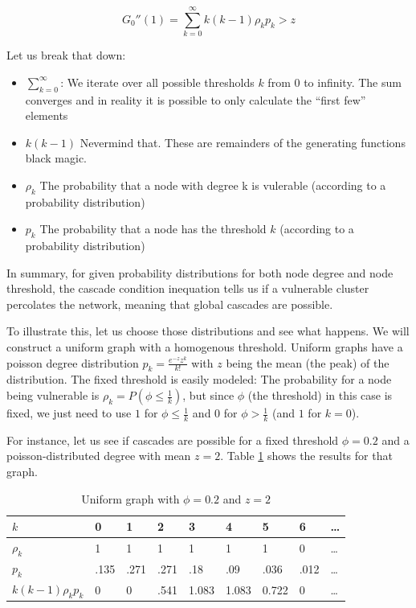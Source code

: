 \documentclass{sig-alternate-05-2015}
\begin{document}
\begin{equation}
  G_0''(1) = \sum_{k=0}^\infty k (k-1) \rho_k p_k > z
\end{equation}

Let us break that down:

\begin{itemize}
  \item $\sum_{k=0}^\infty$: We iterate over all possible thresholds $k$ from $0$ to infinity. The sum converges and in reality it is possible to only calculate the ``first few'' elements
  \item $k (k-1)$ Nevermind that. These are remainders of the generating functions black magic.
  \item $\rho_k$ The probability that a node with degree k is vulerable (according to a probability distribution)
  \item $p_k$ The probability that a node has the threshold $k$ (according to a probability distribution)
\end{itemize}

In summary, for given probability distributions for both node degree and node threshold, the cascade condition inequation tells us if a vulnerable cluster percolates the network, meaning that global cascades are possible.

To illustrate this, let us choose those distributions and see what happens. We will construct a uniform graph with a homogenous threshold. Uniform graphs have a poisson degree distribution $p_k = \frac{e^{-z}z^k}{k!}$ with $z$ being the mean (the peak) of the distribution. The fixed threshold is easily modeled: The probability for a node being vulnerable is $\rho_k = P(\phi \leq \frac{1}{k})$, but since $\phi$ (the threshold) in this case is fixed, we just need to use $1$ for $\phi \leq \frac{1}{k}$ and $0$ for $\phi > \frac{1}{k}$ (and $1$ for $k = 0$).

For instance, let us see if cascades are possible for a fixed threshold $\phi = 0.2$ and a poisson-distributed degree with mean $z = 2$. Table \ref{tab:z2} shows the results for that graph.

\begin{table}[t!]
\centering
\caption{Uniform graph with $\phi = 0.2$ and $z = 2$}
\label{tab:z2}
\begin{tabular}{|l|l|l|l|l|l|l|l|l|}
\hline
$k$                       & 0     & 1      & 2     & 3      & 4      & 5      & 6     & \ldots\\ \hline
$\rho_k$                  & 1     & 1      & 1     & 1      & 1      & 1      & 0     & \ldots\\ \hline
$p_k$                     & .135  & .271   & .271  & .18    & .09    & .036   & .012  & \ldots\\ \hline
$k (k-1) \rho_k p_k$      & 0     & 0      & .541  & 1.083  & 1.083  & 0.722  & 0     & \ldots\\ \hline
\end{tabular}
\end{table}
\end{document}
